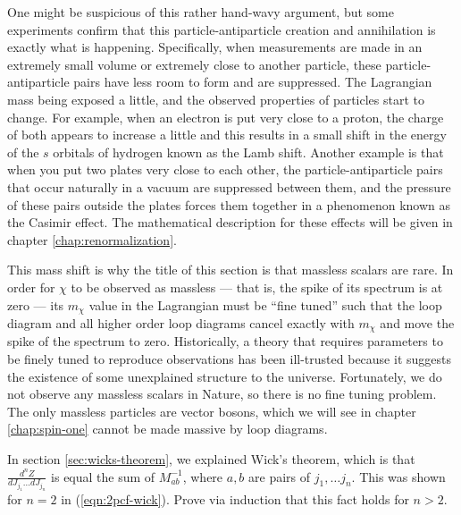 One might be suspicious of this rather hand-wavy argument, but some experiments confirm that this particle-antiparticle creation and annihilation is exactly what is happening. Specifically, when measurements are made in an extremely small volume or extremely close to another particle, these particle-antiparticle pairs have less room to form and are suppressed. The Lagrangian mass being exposed a little, and the observed properties of particles start to change. For example, when an electron is put very close to a proton, the charge of both appears to increase a little and this results in a small shift in the energy of the $s$ orbitals of hydrogen known as the Lamb shift. Another example is that when you put two plates very close to each other, the particle-antiparticle pairs that occur naturally in a vacuum are suppressed between them, and the pressure of these pairs outside the plates forces them together in a phenomenon known as the Casimir effect. The mathematical description for these effects will be given in chapter \ref{chap:renormalization}.

This mass shift is why the title of this section is that massless scalars are rare. In order for $\chi$ to be observed as massless --- that is, the spike of its spectrum is at zero --- its $m_\chi$ value in the Lagrangian must be ``fine tuned'' such that the loop diagram and all higher order loop diagrams cancel exactly with $m_\chi$ and move the spike of the spectrum to zero. Historically, a theory that requires parameters to be finely tuned to reproduce observations has been ill-trusted because it suggests the existence of some unexplained structure to the universe. Fortunately, we do not observe any massless scalars in Nature, so there is no fine tuning problem. The only massless particles are vector bosons, which we will see in chapter \ref{chap:spin-one} cannot be made massive by loop diagrams.




\begin{problem}
  In section \ref{sec:wicks-theorem}, we explained Wick's theorem, which is that 
  $\frac{d^nZ}{d J_{j_1}\dots dJ_{j_n}}$ is equal the sum of $M^{-1}_{ab}$, where $a, b$ are pairs of $j_1,\dots j_n$. This was shown for $n=2$ in (\ref{eqn:2pcf-wick}). Prove via induction that this fact holds for $n>2$.
\end{problem}

